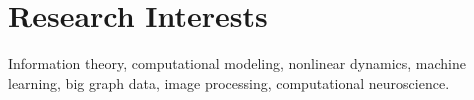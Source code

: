\section{\sc Research Interests} %
Information theory, computational modeling, nonlinear dynamics, machine learning, big graph data, image processing, computational neuroscience.
\vspace{1mm}

